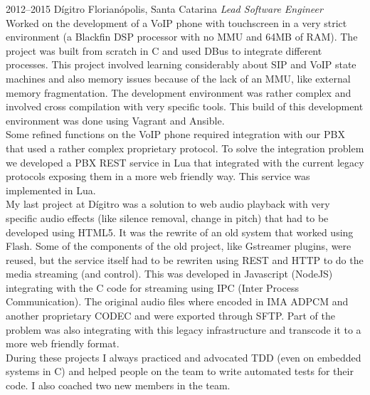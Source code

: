 \documentclass[]{friggeri-cv} %
\begin{document}
\begin{entrylist}
\entry
{2012--2015}
{Dígitro}
{Florianópolis, Santa Catarina}
{\emph{Lead Software Engineer} \\

Worked on the development of a VoIP phone with touchscreen
in a very strict environment
(a Blackfin DSP processor with no MMU and 64MB of RAM).
The project was built from scratch in C and used
DBus to integrate different processes. This project involved
learning considerably about SIP and VoIP state machines
and also memory issues because of the lack of an MMU, like
external memory fragmentation. The development environment
was rather complex and involved cross compilation with
very specific tools. This build of this development environment
was done using Vagrant and Ansible. \\

Some refined functions on the VoIP phone required integration
with our PBX that used a rather complex proprietary protocol.
To solve the integration problem we developed a PBX
REST service in Lua that integrated with the current legacy
protocols exposing them in a more web friendly way. This service
was implemented in Lua. \\

My last project at Dígitro was a solution to web audio playback
with very specific audio effects (like silence removal,
change in pitch) that had to be developed using HTML5.
It was the rewrite of an old system that worked using Flash.
Some of the components of the old project, like Gstreamer
plugins, were reused, but the service itself had to be rewriten
using REST and HTTP to do the media streaming (and control).
This was developed in Javascript (NodeJS) integrating with the
C code for streaming using IPC (Inter Process Communication).
The original audio files where encoded in IMA ADPCM and another
proprietary CODEC and were exported through SFTP. Part of the
problem was also integrating with this legacy infrastructure and
transcode it to a more web friendly format. \\

During these projects I always practiced and advocated TDD
(even on embedded systems in C) and helped people on
the team to write automated tests for their code. I also
coached two new members in the team.
}
\end{entrylist}
\end{document}
